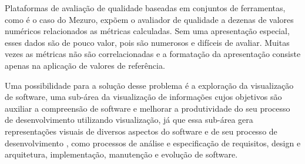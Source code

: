 Plataformas de avaliação de qualidade baseadas em conjuntos de ferramentas, como é o caso do Mezuro, expõem o avaliador de qualidade a dezenas de valores numéricos relacionados as métricas calculadas. Sem uma apresentação especial, esses dados são de pouco valor, pois são numerosos e difíceis de avaliar. Muitas vezes as métricas não são correlacionadas e a formatação da apresentação consiste apenas na aplicação de valores de referência.

Uma possibilidade para a solução desse problema é a exploração da visualização de software, uma sub-área da visualização de informações cujos objetivos são auxiliar a compreensão de software e melhorar a produtividade do seu processo de desenvolvimento utilizando visualização, já que essa sub-área gera representações visuais de diversos aspectos do software e de seu processo de desenvolvimento \cite{rafaelmessiasmartins2012}, como processos de análise e especificação de requisitos, design e arquitetura, implementação, manutenção e evolução de software.

